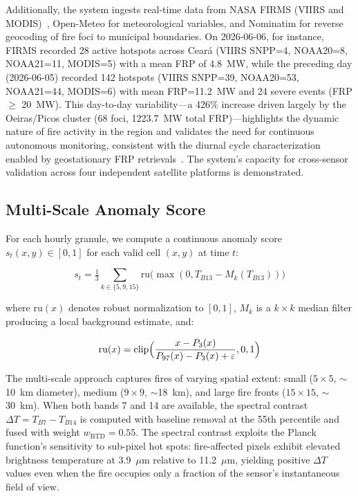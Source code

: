 \documentclass[5p,twocolumn]{elsarticle}
\newcommand{\abbrev}[1]{{\small\textsc{#1}}}
\newcommand{\ru}{\text{ru}}
\newcommand{\clip}{\text{clip}}
\begin{document}
Additionally, the system ingests real-time data from \abbrev{NASA} \abbrev{FIRMS} (\abbrev{VIIRS} and \abbrev{MODIS})~\cite{schroeder2014_viiirs,giglio2016_modis}, Open-Meteo for meteorological variables, and Nominatim for reverse geocoding of fire foci to municipal boundaries. On 2026-06-06, for instance, \abbrev{FIRMS} recorded 28 active hotspots across Cear\'{a} (VIIRS SNPP=4, NOAA20=8, NOAA21=11, MODIS=5) with a mean \abbrev{FRP} of 4.8~MW, while the preceding day (2026-06-05) recorded 142 hotspots (VIIRS SNPP=39, NOAA20=53, NOAA21=44, MODIS=6) with mean \abbrev{FRP}=11.2~MW and 24 severe events (\abbrev{FRP} $\ge$ 20~MW). This day-to-day variability---a 426\% increase driven largely by the Oeiras/Picos cluster (68 foci, 1223.7~MW total \abbrev{FRP})---highlights the dynamic nature of fire activity in the region and validates the need for continuous autonomous monitoring, consistent with the diurnal cycle characterization enabled by geostationary \abbrev{FRP} retrievals~\cite{xu2020_goesfrp,zhang2022_goes16}. The system's capacity for cross-sensor validation across four independent satellite platforms is demonstrated.

\subsection{Multi-Scale Anomaly Score}

For each hourly granule, we compute a continuous anomaly score $s_t(x,y) \in [0,1]$ for each valid cell $(x,y)$ at time $t$:

\begin{equation}
s_t = \tfrac13 \sum_{k\in\{5,9,15\}} \!
  \ru\bigl(\max(0, T_{B13} - M_k(T_{B13}))\bigr)
\label{eq:multiscale}
\end{equation}

where $\ru(x)$ denotes robust normalization to $[0,1]$, $M_k$ is a $k \times k$ median filter producing a local background estimate, and:

\begin{equation}
\ru(x) = \clip\Bigl(\frac{x - P_3(x)}{P_{97}(x) - P_3(x) + \varepsilon}, 0, 1\Bigr)
\label{eq:robust_unit}
\end{equation}

The multi-scale approach captures fires of varying spatial extent: small (\(5\times5\), \(\sim\)10~km diameter), medium (\(9\times9\), \(\sim\)18~km), and large fire fronts (\(15\times15\), \(\sim\)30~km). When both bands 7 and 14 are available, the spectral contrast $\Delta T = T_{B7} - T_{B14}$ is computed with baseline removal at the 55th percentile and fused with weight $w_{\text{BTD}} = 0.55$. The spectral contrast exploits the Planck function's sensitivity to sub-pixel hot spots: fire-affected pixels exhibit elevated brightness temperature at 3.9~$\mu$m relative to 11.2~$\mu$m, yielding positive $\Delta T$ values even when the fire occupies only a fraction of the sensor's instantaneous field of view.
\end{document}
